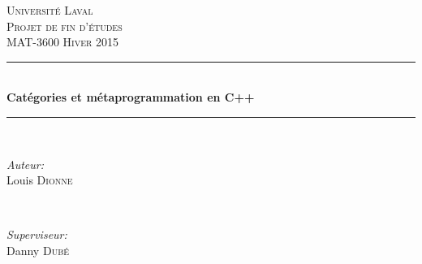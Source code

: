 \begin{titlepage}

\newcommand{\HRule}{\rule{\linewidth}{0.5mm}} %

\center %


\textsc{\LARGE Université Laval}\\[1.5cm] %
\textsc{\Large Projet de fin d'études}\\[0.5cm] %
\textsc{\large MAT-3600 Hiver 2015}\\[0.5cm] %


\HRule \\[0.4cm]
{ \huge \bfseries Catégories et métaprogrammation en C++}\\[0.4cm] %
\HRule \\[1.5cm]


\begin{minipage}{0.4\textwidth}
\begin{flushleft} \large
\emph{Auteur:}\\
Louis \textsc{Dionne} %
\end{flushleft}
\end{minipage}
~
\begin{minipage}{0.4\textwidth}
\begin{flushright} \large
\emph{Superviseur:} \\
Danny \textsc{Dubé} %
\end{flushright}
\end{minipage}\\[4cm]




\end{titlepage}
